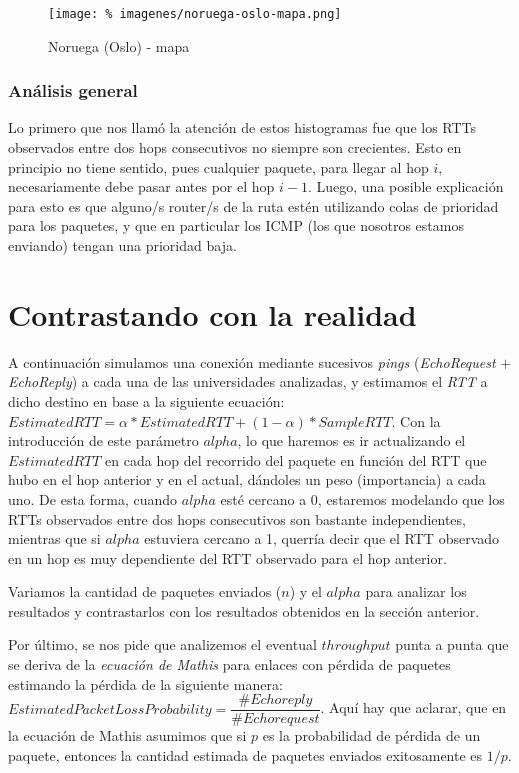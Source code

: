 \documentclass[final,inline,a4paper,narroweqnarray]{ieee}
\let\Oldsection\section
\renewcommand{\section}{\FloatBarrier\Oldsection}
\let\Oldsubsubsection\subsubsection
\renewcommand{\subsubsection}{\FloatBarrier\Oldsubsubsection}
\begin{document}
\begin{figure}[ht]\begin{center}
   \texttt{[image: \%
    imagenes/noruega-oslo-mapa.png]}
    \caption{Noruega (Oslo) - mapa}
    \label{Noruega}
\end{center}\end{figure}

\subsubsection{Análisis general}
Lo primero que nos llamó la atención de estos histogramas fue que los RTTs observados entre dos
hops consecutivos no siempre son crecientes. Esto en principio no tiene sentido, pues cualquier 
paquete, para llegar al hop $i$, necesariamente debe pasar antes por el hop $i-1$. Luego, 
una posible explicación para esto es que alguno/s router/s de la ruta estén utilizando colas
de prioridad para los paquetes, y que en particular los ICMP (los que nosotros estamos enviando)
tengan una prioridad baja. 

\section{Contrastando con la realidad}
A continuación simulamos una conexión mediante sucesivos \emph{pings} (\emph{EchoRequest} $+$ 
\emph{EchoReply}) 
a cada una de las universidades analizadas, y estimamos el \emph{RTT} a dicho destino 
en base a la siguiente ecuación: 
$ EstimatedRTT = \alpha * EstimatedRTT + (1 - \alpha) * SampleRTT $. Con la introducción de
este parámetro $alpha$, lo que haremos es ir actualizando el $EstimatedRTT$ en cada hop del 
recorrido del paquete en función del RTT que hubo en el hop anterior y en el actual, dándoles
un peso (importancia) a cada uno. De esta forma, cuando $alpha$ esté cercano a 0, estaremos
modelando que los RTTs observados entre dos hops consecutivos son bastante independientes,
mientras que si $alpha$ estuviera cercano a 1, querría decir que el RTT observado en un
hop es muy dependiente del RTT observado para el hop anterior. 

Variamos la cantidad de paquetes enviados ($n$) y el $alpha$ para analizar los resultados 
y contrastarlos con los resultados obtenidos en la sección anterior.

Por último, se nos pide que analizemos el eventual $throughput$ punta a punta que se deriva de la
\emph{ecuación de Mathis} para enlaces con pérdida de paquetes estimando la pérdida de la 
siguiente manera:
$EstimatedPacketLossProbability = \dfrac{\#Echo reply}{\#Echo request}$. Aquí hay que aclarar,
que en la ecuación de Mathis asumimos que si $p$ es la probabilidad de pérdida de un paquete,
entonces la cantidad estimada de paquetes enviados exitosamente es $1/p$.
\end{document}
